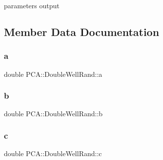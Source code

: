 parameters output 



\subsection{Member Data Documentation}
\hypertarget{class_p_c_a_1_1_double_well_rand_a2291611a2ea4d9c3ee50a904c2fea9b7}{}\label{class_p_c_a_1_1_double_well_rand_a2291611a2ea4d9c3ee50a904c2fea9b7} 
\subsubsection{\texorpdfstring{a}{a}}
{\footnotesize\ttfamily double P\+C\+A\+::\+Double\+Well\+Rand\+::a\hspace{0.3cm}{\ttfamily [private]}}

\hypertarget{class_p_c_a_1_1_double_well_rand_a289b59fbd571f8f377888f48a8c6b8ae}{}\label{class_p_c_a_1_1_double_well_rand_a289b59fbd571f8f377888f48a8c6b8ae} 
\subsubsection{\texorpdfstring{b}{b}}
{\footnotesize\ttfamily double P\+C\+A\+::\+Double\+Well\+Rand\+::b\hspace{0.3cm}{\ttfamily [private]}}

\hypertarget{class_p_c_a_1_1_double_well_rand_a855b2106b6b692f9e837ef282b658c85}{}\label{class_p_c_a_1_1_double_well_rand_a855b2106b6b692f9e837ef282b658c85} 
\subsubsection{\texorpdfstring{c}{c}}
{\footnotesize\ttfamily double P\+C\+A\+::\+Double\+Well\+Rand\+::c\hspace{0.3cm}{\ttfamily [private]}}

\hypertarget{class_p_c_a_1_1_double_well_rand_a627173c860baf5c9744916fc9e203404}{}\label{class_p_c_a_1_1_double_well_rand_a627173c860baf5c9744916fc9e203404} 
